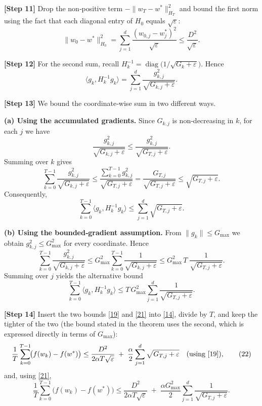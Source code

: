 \documentclass{article}
\begin{document}
\noindent\textbf{[Step 11]}  Drop the non‑positive term $-\|w_{T}-w^{*}\|_{H_{T}}^{2}$ and bound the first norm using the fact that each diagonal entry of $H_{0}$ equals $\sqrt{\varepsilon}$:
\[
\|w_{0}-w^{*}\|_{H_{0}}^{2}
   =\sum_{j=1}^{d}\frac{(w_{0,j}-w^{*}_{j})^{2}}{\sqrt{\varepsilon}}
   \le\frac{D^{2}}{\sqrt{\varepsilon}} .
\tag{15}
\]

\noindent\textbf{[Step 12]}  For the second sum, recall $H_{k}^{-1}=\operatorname{diag}\bigl(1/\sqrt{G_{k}+\varepsilon}\bigr)$. Hence
\[
\langle g_{k},H_{k}^{-1}g_{k}\rangle
   =\sum_{j=1}^{d}\frac{g_{k,j}^{2}}{\sqrt{G_{k,j}+\varepsilon}} .
\tag{16}
\]

\noindent\textbf{[Step 13]}  We bound the coordinate‑wise sum in two different ways.

\medskip
\noindent\textbf{(a)  Using the accumulated gradients.}  
Since $G_{k,j}$ is non‑decreasing in $k$, for each $j$ we have
\[
\frac{g_{k,j}^{2}}{\sqrt{G_{k,j}+\varepsilon}}
   \le\frac{g_{k,j}^{2}}{\sqrt{G_{T,j}+\varepsilon}} .
\tag{17}
\]
Summing over $k$ gives
\[
\sum_{k=0}^{T-1}\frac{g_{k,j}^{2}}{\sqrt{G_{k,j}+\varepsilon}}
   \le\frac{\sum_{k=0}^{T-1}g_{k,j}^{2}}{\sqrt{G_{T,j}+\varepsilon}}
   =\frac{G_{T,j}}{\sqrt{G_{T,j}+\varepsilon}}
   \le\sqrt{G_{T,j}+\varepsilon} .
\tag{18}
\]
Consequently,
\[
\sum_{k=0}^{T-1}\langle g_{k},H_{k}^{-1}g_{k}\rangle
   \le\sum_{j=1}^{d}\sqrt{G_{T,j}+\varepsilon}.
\tag{19}
\]

\medskip
\noindent\textbf{(b)  Using the bounded‑gradient assumption.}  
From $\|g_{k}\|\le G_{\max}$ we obtain $g_{k,j}^{2}\le G_{\max}^{2}$ for every coordinate. Hence
\[
\sum_{k=0}^{T-1}\frac{g_{k,j}^{2}}{\sqrt{G_{k,j}+\varepsilon}}
   \le G_{\max}^{2}\sum_{k=0}^{T-1}\frac{1}{\sqrt{G_{k,j}+\varepsilon}}
   \le G_{\max}^{2}\,T\;\frac{1}{\sqrt{G_{T,j}+\varepsilon}} .
\tag{20}
\]
Summing over $j$ yields the alternative bound
\[
\sum_{k=0}^{T-1}\langle g_{k},H_{k}^{-1}g_{k}\rangle
   \le T\,G_{\max}^{2}\sum_{j=1}^{d}\frac{1}{\sqrt{G_{T,j}+\varepsilon}} .
\tag{21}
\]

\noindent\textbf{[Step 14]}  Insert the two bounds \eqref{19} and \eqref{21} into \eqref{14}, divide by $T$, and keep the tighter of the two (the bound stated in the theorem uses the second, which is expressed directly in terms of $G_{\max}$):
\[
\frac{1}{T}\sum_{k=0}^{T-1}\!\bigl(f(w_{k})-f(w^{*})\bigr)
   \le
   \frac{D^{2}}{2\alpha T\sqrt{\varepsilon}}
   \;+\;
   \frac{\alpha}{2}\sum_{j=1}^{d}\sqrt{G_{T,j}+\varepsilon}
   \quad\text{(using \eqref{19})},
\tag{22}
\]
and, using \eqref{21},
\[
\frac{1}{T}\sum_{k=0}^{T-1}\!\bigl(f(w_{k})-f(w^{*})\bigr)
   \le
   \frac{D^{2}}{2\alpha T\sqrt{\varepsilon}}
   \;+\;
   \frac{\alpha G_{\max}^{2}}{2}\sum_{j=1}^{d}\frac{1}{\sqrt{G_{T,j}+\varepsilon}} .
\tag{23}
\]
\end{document}
